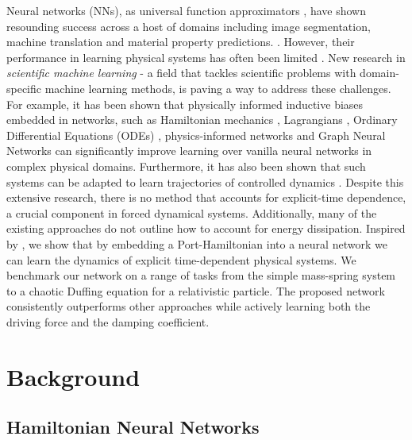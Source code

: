 \documentclass{article}
\begin{document}
Neural networks (NNs), as universal function approximators \cite{hornik_multilayer_1989}, have shown resounding success across a host of domains including image segmentation, machine translation and material property predictions. \cite{he_mask_2018,devlin_bert_2019,toussaint_differentiable_2018,yao_tensormol-01_2018}. However, their performance in learning physical systems has often been limited \cite{greydanus_hamiltonian_2019,pukrittayakamee_simultaneous_2009}. New research in \textit{scientific machine learning} - a field that tackles scientific problems with domain-specific machine learning methods, is paving a way to address these challenges. For example, it has been shown that physically informed inductive biases embedded in networks, such as Hamiltonian mechanics \cite{mattheakis_hamiltonian_2020, greydanus_hamiltonian_2019}, Lagrangians \cite{cranmer_lagrangian_2020, lutter_deep_2019}, Ordinary Differential Equations (ODEs) \cite{chen_neural_2018}, physics-informed networks \cite{raissi_physics_2017} and Graph Neural Networks \cite{battaglia_interaction_2016,sanchez-gonzalez_hamiltonian_2019} can significantly improve learning over vanilla neural networks in complex physical domains. Furthermore, it has also been shown that such systems can be adapted to learn trajectories of controlled dynamics \cite{lutter_deep_2019,zhong_dissipative_2020}. Despite this extensive research, there is no method that accounts for explicit-time dependence, a crucial component in forced dynamical systems. Additionally, many of the existing approaches do not outline how to account for energy dissipation. Inspired by \cite{zhong_dissipative_2020}, we show that by embedding a Port-Hamiltonian into a neural network we can learn the dynamics of explicit time-dependent physical systems. We benchmark our network on a range of tasks from the simple mass-spring system to a chaotic Duffing equation for a relativistic particle. The proposed network consistently outperforms other approaches while actively learning both the driving force and the damping coefficient. 

\section{Background}

\subsection{Hamiltonian Neural Networks}
\end{document}
